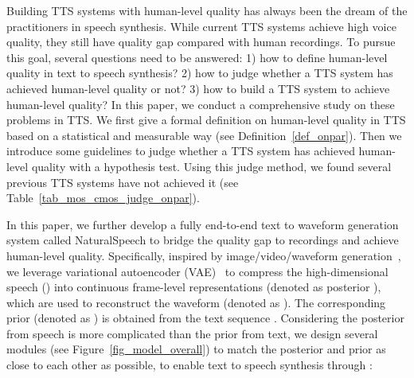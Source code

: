 \documentclass{article}
\theoremstyle{definition}
\def\myname{NaturalSpeech}
\begin{document}
Building TTS systems with human-level quality has always been the dream of the practitioners in speech synthesis. While current TTS systems achieve high voice quality, they still have quality gap compared with human recordings. To pursue this goal, several questions need to be answered: 1) how to define human-level quality in text to speech synthesis? 2) how to judge whether a TTS system has achieved human-level quality or not? 3) how to build a TTS system to achieve human-level quality? In this paper, we conduct a comprehensive study on these problems in TTS. We first give a formal definition on human-level quality in TTS based on a statistical and measurable way (see Definition~\ref{def_onpar}). Then we introduce some guidelines to judge whether a TTS system has achieved human-level quality with a hypothesis test. Using this judge method, we found several previous TTS systems have not achieved it (see Table~\ref{tab_mos_cmos_judge_onpar}). 



In this paper, we further develop a fully end-to-end text to waveform generation system called \myname{} to bridge the quality gap to recordings and achieve human-level quality. Specifically, inspired by image/video/waveform generation~\cite{van2017neural,ramesh2021zero,kim2021conditional}, we leverage variational autoencoder (VAE)~\cite{kingma2013auto} to compress the high-dimensional speech () into continuous frame-level representations (denoted as posterior ), which are used to reconstruct the waveform (denoted as ). The corresponding prior (denoted as ) is obtained from the text sequence . Considering the posterior from speech is more complicated than the prior from text, we design several modules (see Figure~\ref{fig_model_overall}) to match the posterior and prior as close to each other as possible, to enable text to speech synthesis through :
\end{document}
